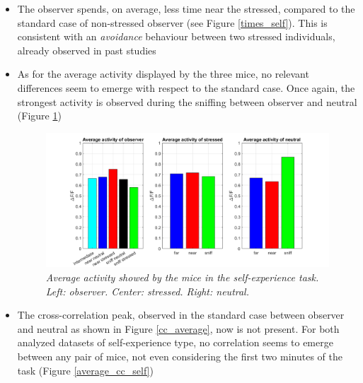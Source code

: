 \documentclass[12pt, a4paper]{report}
\begin{document}
\begin{itemize}
	\item The observer spends, on average, less time near the stressed, compared to the standard case of non-stressed observer (see Figure \ref{times_self}). This is consistent with an \textit{avoidance} behaviour between two stressed individuals, already observed in past studies \cite{24} %
	
	\item As for the average activity displayed by the three mice, no relevant differences seem to emerge with respect to the standard case. Once again, the strongest activity is observed during the sniffing between observer and neutral (Figure \ref{activity_barplot_self})
	
	\begin{figure}[H]
		
		\begin{center}
			\hspace*{-1.2cm}
			\includegraphics[scale=.48]{activity_barplot_self.png} 
		\end{center} 
		\caption{\textit{Average activity showed by the mice in the self-experience task. Left: observer. Center: stressed. Right: neutral.}}
		\label{activity_barplot_self}
	\end{figure}
	
	\item The cross-correlation peak, observed in the standard case between observer and neutral as shown in Figure \ref{cc_average}, now is not present. For both analyzed datasets of self-experience type, no correlation seems to emerge between any pair of mice, not even considering the first two minutes of the task (Figure \ref{average_cc_self})
	
	\begin{figure}[H]
		

\end{figure}
\end{itemize}
\end{document}
